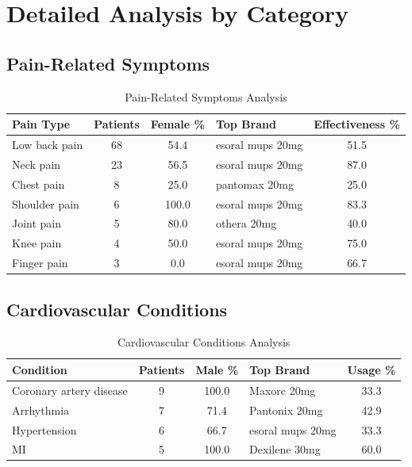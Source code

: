 \documentclass[10pt]{article}
\begin{document}
\section{Detailed Analysis by Category}

\subsection{Pain-Related Symptoms}
\begin{table}[h!]
\centering
\caption{Pain-Related Symptoms Analysis}
\label{tab:pain_symptoms}
\begin{tabular}{l|c|c|l|c}
\toprule
\rowcolor{headercolor}
\textbf{Pain Type} & \textbf{Patients} & \textbf{Female \%} & \textbf{Top Brand} & \textbf{Effectiveness \%} \\
\midrule
Low back pain & 68 & 54.4 & esoral mups 20mg & 51.5 \\
\rowcolor{altrowcolor}
Neck pain & 23 & 56.5 & esoral mups 20mg & 87.0 \\
Chest pain & 8 & 25.0 & pantomax 20mg & 25.0 \\
\rowcolor{altrowcolor}
Shoulder pain & 6 & 100.0 & esoral mups 20mg & 83.3 \\
Joint pain & 5 & 80.0 & othera 20mg & 40.0 \\
\rowcolor{altrowcolor}
Knee pain & 4 & 50.0 & esoral mups 20mg & 75.0 \\
Finger pain & 3 & 0.0 & esoral mups 20mg & 66.7 \\
\bottomrule
\end{tabular}
\end{table}

\subsection{Cardiovascular Conditions}
\begin{table}[h!]
\centering
\caption{Cardiovascular Conditions Analysis}
\label{tab:cardio_conditions}
\begin{tabular}{l|c|c|l|c}
\toprule
\rowcolor{headercolor}
\textbf{Condition} & \textbf{Patients} & \textbf{Male \%} & \textbf{Top Brand} & \textbf{Usage \%} \\
\midrule
Coronary artery disease & 9 & 100.0 & Maxorc 20mg & 33.3 \\
\rowcolor{altrowcolor}
Arrhythmia & 7 & 71.4 & Pantonix 20mg & 42.9 \\
Hypertension & 6 & 66.7 & esoral mups 20mg & 33.3 \\
\rowcolor{altrowcolor}
MI & 5 & 100.0 & Dexilene 30mg & 60.0 \\
\bottomrule
\end{tabular}
\end{table}
\end{document}
